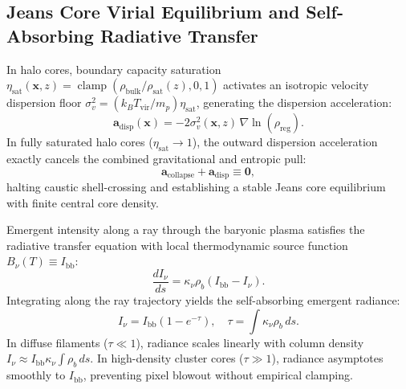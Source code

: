 \documentclass[11pt,letterpaper]{article}
\theoremstyle{plain}
\begin{document}
\subsection{Jeans Core Virial Equilibrium and Self-Absorbing Radiative Transfer}
In halo cores, boundary capacity saturation $\eta_{\mathrm{sat}}(\mathbf{x}, z) = \operatorname{clamp}(\rho_{\mathrm{bulk}} / \rho_{\mathrm{sat}}(z), 0, 1)$ activates an isotropic velocity dispersion floor $\sigma_v^2 = (k_B T_{\mathrm{vir}} / m_p) \eta_{\mathrm{sat}}$, generating the dispersion acceleration:
\begin{equation}
\mathbf{a}_{\mathrm{disp}}(\mathbf{x}) = -2 \sigma_v^2(\mathbf{x}, z) \, \nabla \ln(\rho_{\mathrm{reg}}).
\end{equation}
In fully saturated halo cores ($\eta_{\mathrm{sat}} \to 1$), the outward dispersion acceleration exactly cancels the combined gravitational and entropic pull:
\begin{equation}
\mathbf{a}_{\mathrm{collapse}} + \mathbf{a}_{\mathrm{disp}} \equiv \mathbf{0},
\end{equation}
halting caustic shell-crossing and establishing a stable Jeans core equilibrium with finite central core density.


Emergent intensity along a ray through the baryonic plasma satisfies the radiative transfer equation with local thermodynamic source function $B_\nu(T) \equiv I_{\mathrm{bb}}$:
\begin{equation}
\frac{d I_\nu}{ds} = \kappa_\nu \rho_b (I_{\mathrm{bb}} - I_\nu).
\end{equation}
Integrating along the ray trajectory yields the self-absorbing emergent radiance:
\begin{equation}
I_\nu = I_{\mathrm{bb}} \left( 1 - e^{-\tau} \right), \quad \tau = \int \kappa_\nu \rho_b \, ds.
\end{equation}
In diffuse filaments ($\tau \ll 1$), radiance scales linearly with column density $I_\nu \approx I_{\mathrm{bb}} \kappa_\nu \int \rho_b \, ds$. In high-density cluster cores ($\tau \gg 1$), radiance asymptotes smoothly to $I_{\mathrm{bb}}$, preventing pixel blowout without empirical clamping.
\end{document}
